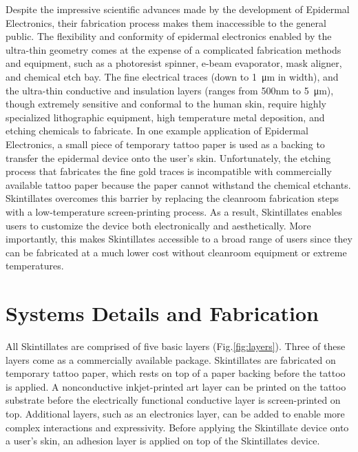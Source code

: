 \documentclass{sigchi}
\begin{document}
Despite the impressive scientific advances made by the development of Epidermal Electronics, their fabrication process makes them inaccessible to the general public. The flexibility and conformity of epidermal electronics enabled by the ultra-thin geometry comes at the expense of a complicated fabrication methods and equipment, such as a photoresist spinner, e-beam evaporator, mask aligner, and chemical etch bay\cite{Kim:2011bv}. The fine electrical traces (down to \SI{1}{\micro\metre} in width), and the ultra-thin conductive and insulation layers (ranges from 500nm to 5\SI{}{\micro\metre}), though extremely sensitive and conformal to the human skin, require highly specialized lithographic equipment, high temperature metal deposition, and etching chemicals to fabricate\cite{Kim:2011bv,Kim:2014iq}. In one example application of Epidermal Electronics, a small piece of temporary tattoo paper is used as a backing to transfer the epidermal device onto the user's skin\cite{Kim:2011bv}. Unfortunately, the etching process that fabricates the fine gold traces is incompatible with commercially available tattoo paper because the paper cannot withstand the chemical etchants. Skintillates overcomes this barrier by replacing the cleanroom fabrication steps with a low-temperature screen-printing process. As a result, Skintillates enables users to customize the device both electronically and aesthetically.  More importantly, this makes Skintillates accessible to a broad range of users since they can be fabricated at a much lower cost without cleanroom equipment or extreme temperatures. 

\section{Systems Details and Fabrication}
 All Skintillates are comprised of five basic layers (Fig.\ref{fig:layers}). Three of these layers come as a commercially available package. Skintillates are fabricated on temporary tattoo paper, which rests on top of a paper backing before the tattoo is applied. A nonconductive inkjet-printed art layer can be printed on the tattoo substrate before the electrically functional conductive layer is screen-printed on top. Additional layers, such as an electronics layer, can be added to enable more complex interactions and expressivity. Before applying the Skintillate device onto a user's skin, an adhesion layer is applied on top of the Skintillates device. 
\end{document}

